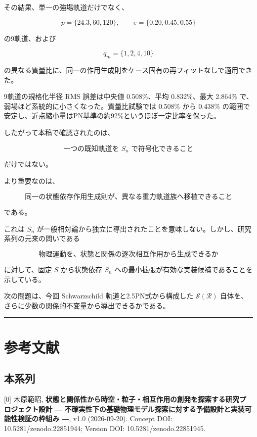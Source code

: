 \documentclass[
  a4paper,
]{ltjsarticle}
\begin{document}
その結果、単一の強場軌道だけでなく、

\[
p=\{24.3,60,120\},
\qquad
e=\{0.20,0.45,0.55\}
\]

の9軌道、および

\[
q_m=\{1,2,4,10\}
\]

の異なる質量比に、同一の作用生成則をケース固有の再フィットなしで適用できた。

9軌道の規格化半径 RMS 誤差は中央値 0.508\%、平均 0.832\%、最大 2.864\%
で、弱場ほど系統的に小さくなった。質量比試験では 0.508\% から 0.438\%
の範囲で安定し、近点縮小量はPN基準の約92\%というほぼ一定比率を保った。

したがって本稿で確認されたのは、

\[
\boxed{
\text{一つの既知軌道を }S_n\text{ で符号化できること}
}
\]

だけではない。

より重要なのは、

\[
\boxed{
\text{同一の状態依存作用生成則が、異なる重力軌道族へ移植できること}
}
\]

である。

これは \(S_n\)
が一般相対論から独立に導出されたことを意味しない。しかし、研究系列の元来の問いである

\[
\boxed{
\text{物理運動を、状態と関係の逐次相互作用から生成できるか}
}
\]

に対して、固定 \(S\) から状態依存 \(S_n\)
への最小拡張が有効な実装候補であることを示している。

次の問題は、今回 Schwarzschild 軌道と2.5PN式から構成した
\(\mathcal S(\mathcal R)\)
自体を、さらに少数の関係的不変量から導出できるかである。

\begin{center}\rule{0.5\linewidth}{0.5pt}\end{center}

\section{参考文献}\label{ux53c2ux8003ux6587ux732e}

\subsection{本系列}\label{ux672cux7cfbux5217}

{[}0{]} 木原範昭,
\textbf{状態と関係性から時空・粒子・相互作用の創発を探索する研究プロジェクト設計
― 不確実性下の基礎物理モデル探索に対する予備設計と実装可能性検証の枠組み
―}, v1.0 (2026-09-20). Concept DOI: 10.5281/zenodo.22851944; Version
DOI: 10.5281/zenodo.22851945.
\end{document}
